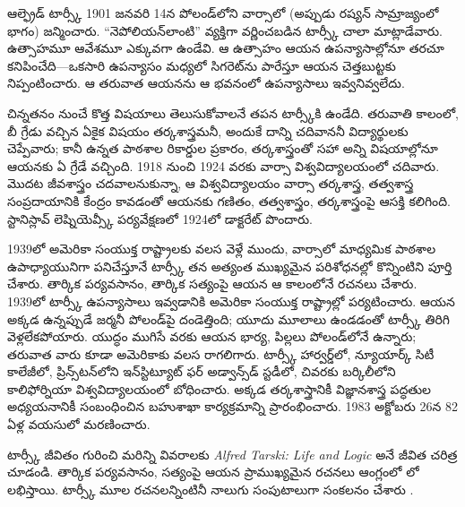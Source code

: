 \documentclass[../../../include/open-logic-section]{subfiles}
\begin{document}



ఆల్ఫ్రెడ్ టార్స్కీ 1901 జనవరి 14న పోలండ్‌లోని వార్సాలో (అప్పుడు రష్యన్ సామ్రాజ్యంలో భాగం) జన్మించారు. ``నెపోలియన్‌లాంటి'' వ్యక్తిగా వర్ణించబడిన టార్స్కీ చాలా మాట్లాడేవారు. ఉత్సాహమూ ఆవేశమూ ఎక్కువగా ఉండేవి. ఆ ఉత్సాహం ఆయన ఉపన్యాసాల్లోనూ తరచూ కనిపించేది---ఒకసారి ఉపన్యాసం మధ్యలో సిగరెట్‌ను పారేస్తూ ఆయన చెత్తబుట్టకు నిప్పంటించారు. ఆ తరువాత ఆయనను ఆ భవనంలో ఉపన్యాసాలు ఇవ్వనివ్వలేదు.

చిన్నతనం నుంచే కొత్త విషయాలు తెలుసుకోవాలనే తపన టార్స్కీకి ఉండేది. తరువాతి కాలంలో, బీ గ్రేడు వచ్చిన ఏకైక విషయం తర్కశాస్త్రమనీ, అందుకే దాన్ని చదివాననీ విద్యార్థులకు చెప్పేవారు; కానీ ఉన్నత పాఠశాల రికార్డుల ప్రకారం, తర్కశాస్త్రంతో సహా అన్ని విషయాల్లోనూ ఆయనకు ఏ గ్రేడే వచ్చింది. 1918 నుంచి 1924 వరకు వార్సా విశ్వవిద్యాలయంలో చదివారు. మొదట జీవశాస్త్రం చదవాలనుకున్నా, ఆ విశ్వవిద్యాలయం వార్సా తర్కశాస్త్ర, తత్వశాస్త్ర సంప్రదాయానికి కేంద్రం కావడంతో ఆయనకు గణితం, తత్వశాస్త్రం, తర్కశాస్త్రంపై ఆసక్తి కలిగింది. స్టానిస్లావ్ లెష్నియెవ్స్కీ పర్యవేక్షణలో 1924లో డాక్టరేట్ పొందారు.

1939లో అమెరికా సంయుక్త రాష్ట్రాలకు వలస వెళ్లే ముందు, వార్సాలో మాధ్యమిక పాఠశాల ఉపాధ్యాయునిగా పనిచేస్తూనే టార్స్కీ తన అత్యంత ముఖ్యమైన పరిశోధనల్లో కొన్నింటిని పూర్తి చేశారు. తార్కిక పర్యవసానం, తార్కిక సత్యంపై ఆయన ఆ కాలంలోనే రచనలు చేశారు. 1939లో టార్స్కీ ఉపన్యాసాలు ఇవ్వడానికి అమెరికా సంయుక్త రాష్ట్రాల్లో పర్యటించారు. ఆయన అక్కడ ఉన్నప్పుడే జర్మనీ పోలండ్‌పై దండెత్తింది; యూదు మూలాలు ఉండడంతో టార్స్కీ తిరిగి వెళ్లలేకపోయారు. యుద్ధం ముగిసే వరకు ఆయన భార్య, పిల్లలు పోలండ్‌లోనే ఉన్నారు; తరువాత వారు కూడా అమెరికాకు వలస రాగలిగారు. టార్స్కీ హార్వర్డ్‌లో, న్యూయార్క్ సిటీ కాలేజీలో, ప్రిన్స్‌టన్‌లోని ఇన్‌స్టిట్యూట్ ఫర్ అడ్వాన్స్‌డ్ స్టడీలో, చివరకు బర్కిలీలోని కాలిఫోర్నియా విశ్వవిద్యాలయంలో బోధించారు. అక్కడ తర్కశాస్త్రానికీ విజ్ఞానశాస్త్ర పద్ధతుల అధ్యయనానికీ సంబంధించిన బహుశాఖా కార్యక్రమాన్ని ప్రారంభించారు. 1983 అక్టోబరు 26న 82 ఏళ్ల వయసులో మరణించారు.

\begin{reading}
టార్స్కీ జీవితం గురించి మరిన్ని వివరాలకు \emph{Alfred Tarski: Life
  and Logic} అనే జీవిత చరిత్ర \citep{Feferman2004} చూడండి. తార్కిక పర్యవసానం, సత్యంపై ఆయన ప్రాముఖ్యమైన రచనలు ఆంగ్లంలో \citep{Tarski1983}లో లభిస్తాయి. టార్స్కీ మూల రచనలన్నింటినీ నాలుగు సంపుటాలుగా సంకలనం చేశారు \citep{Tarski1981}.
\end{reading}
\end{document}
